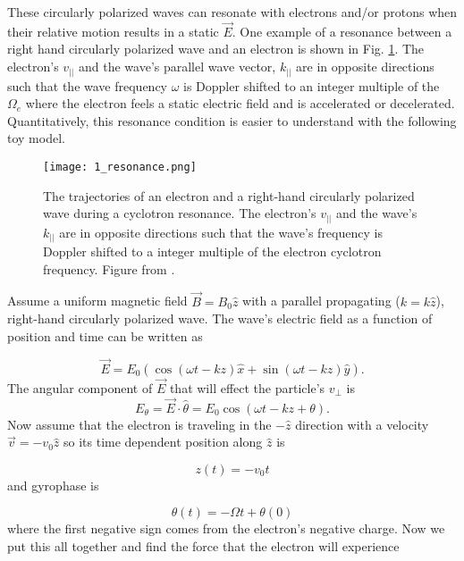 These circularly polarized waves can resonate with electrons and/or protons when their relative motion results in a static $\vec{E}$. One example of a resonance between a right hand circularly polarized wave and an electron is shown in Fig. \ref{Intro:resonance_diagram}. The electron's $v_{||}$ and the wave's parallel wave vector, $k_{||}$ are in opposite directions such that the wave frequency $\omega$ is Doppler shifted to an integer multiple of the $\Omega_e$ where the electron feels a static electric field and is accelerated or decelerated. Quantitatively, this resonance condition is easier to understand with the following toy model.

\begin{figure}
\texttt{[image: 1\_resonance.png]}
\caption{The trajectories of an electron and a right-hand circularly polarized wave during a cyclotron resonance. The electron's $v_{||}$ and the wave's $k_{||}$ are in opposite directions such that the wave's frequency is Doppler shifted to a integer multiple of the electron cyclotron frequency. Figure from \citep{Tsurutani1997}.}
\label{Intro:resonance_diagram}
\end{figure}

Assume a uniform magnetic field $\vec{B} = B_0 \hat{z}$ with a parallel propagating ($k = k\hat{z}$), right-hand circularly polarized wave. The wave's electric field as a function of position and time can be written as

\begin{equation}
\vec{E} = E_0 (\cos{(\omega t - kz)}\hat{x} + \sin{(\omega t - kz)}\hat{y}).
\end{equation} The angular component of $\vec{E}$ that will effect the particle's $v_\perp$ is 
\begin{equation}
E_\theta = \vec{E} \cdot \hat{\theta} = E_0 \cos{(\omega t - kz + \theta)}.
\end{equation} Now assume that the electron is traveling in the $-\hat{z}$ direction with a velocity $\vec{v} = -v_0 \hat{z}$ so its time dependent position along $\hat{z}$ is

\begin{equation}
z(t) = -v_0 t
\end{equation} and gyrophase is

\begin{equation}
\theta(t) = -\Omega t + \theta(0)
\end{equation} where the first negative sign comes from the electron's negative charge. Now we put this all together and find the force that the electron will experience


